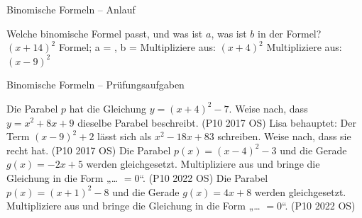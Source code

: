\setcounter{aufgabe}{70}

\begin{aufgabe}{Binomische Formeln – Anlauf}
\begin{teile}
\teil Welche binomische Formel passt, und was ist $a$, was ist $b$ in der Formel? $(x + 14)^2$ \leerfeld Formel; a = \leerfeld , b = \leerfeld
\teil Multipliziere aus: $(x + 4)^2$
\teil Multipliziere aus: $(x - 9)^2$
\end{teile}
\end{aufgabe}

\begin{aufgabe}{Binomische Formeln – Prüfungsaufgaben}
\begin{teile}
\steil Die Parabel $p$ hat die Gleichung $y = (x + 4)^2 - 7$. Weise nach, dass $y = x^2 + 8x + 9$ dieselbe Parabel beschreibt. \hfill (P10 2017 OS)
\steil Lisa behauptet: Der Term $(x - 9)^2 + 2$ lässt sich als $x^2 - 18x + 83$ schreiben. Weise nach, dass sie recht hat. \hfill (P10 2017 OS)
\steil Die Parabel $p(x) = (x - 4)^2 - 3$ und die Gerade $g(x) = -2x + 5$ werden gleichgesetzt. Multipliziere aus und bringe die Gleichung in die Form „… $= 0$“. \hfill (P10 2022 OS)
\steil Die Parabel $p(x) = (x + 1)^2 - 8$ und die Gerade $g(x) = 4x + 8$ werden gleichgesetzt. Multipliziere aus und bringe die Gleichung in die Form „… $= 0$“. \hfill (P10 2022 OS)
\end{teile}
\end{aufgabe}
